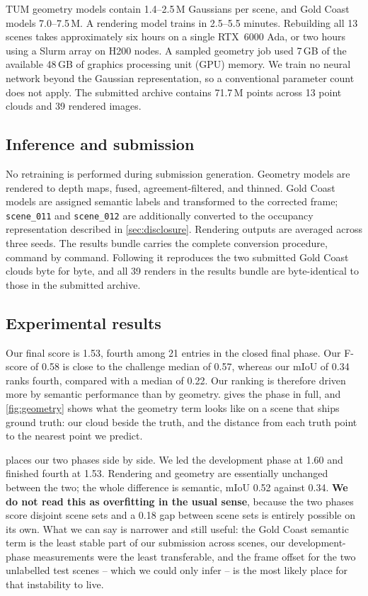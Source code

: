 \documentclass[10pt,twocolumn,letterpaper]{article}
\newcommand{\code}[1]{\texttt{\small #1}}
\begin{document}
TUM geometry models contain 1.4--2.5\,M Gaussians per scene, and Gold Coast
models 7.0--7.5\,M. A rendering model trains in 2.5--5.5 minutes.
Rebuilding all 13 scenes takes approximately six hours on a single RTX~6000 Ada,
or two hours using a Slurm array on H200 nodes. A sampled geometry job used 7\,GB
of the available 48\,GB of graphics processing unit (GPU) memory. We train no
neural network beyond the
Gaussian representation, so a conventional parameter count does not apply. The
submitted archive contains 71.7\,M points across 13 point
clouds and 39 rendered images.

\subsection{Inference and submission}

No retraining is performed during submission generation. Geometry models are
rendered to depth maps, fused, agreement-filtered, and thinned. Gold Coast models
are assigned semantic labels and transformed to the corrected frame;
\code{scene\_011} and \code{scene\_012} are additionally converted to the
occupancy representation described in \cref{sec:disclosure}. Rendering outputs
are averaged across three seeds. The results bundle carries the complete
conversion procedure, command by command. Following it reproduces the two
submitted Gold Coast clouds byte for byte, and all 39 renders in the results bundle are byte-identical
to those in the submitted archive.

\subsection{Experimental results}

Our final score is 1.53, fourth among 21 entries in the closed final phase. Our
F-score of 0.58 is close to the challenge median of 0.57, whereas our
mIoU of 0.34 ranks fourth, compared with a median of 0.22. Our ranking is
therefore driven more by semantic performance than by geometry.
 gives the phase in full, and \cref{fig:geometry} shows
what the geometry term looks like on a scene that ships ground truth: our cloud
beside the truth, and the distance from each truth point to the nearest point we
predict.

 places our two phases side by side. We led the development phase at
1.60 and finished fourth at 1.53. Rendering and geometry are essentially
unchanged between the two; the whole difference is semantic, mIoU 0.52 against
0.34. \textbf{We do not read this as overfitting in the usual sense}, because the
two phases score disjoint scene sets and a 0.18 gap between scene sets is
entirely possible on its own. What we can say is narrower and still useful: the
Gold Coast semantic term is the least stable part of our submission across
scenes, our development-phase measurements were the least transferable, and the
frame offset for the two unlabelled test scenes -- which we could only infer --
is the most likely place for that instability to live.
\end{document}
